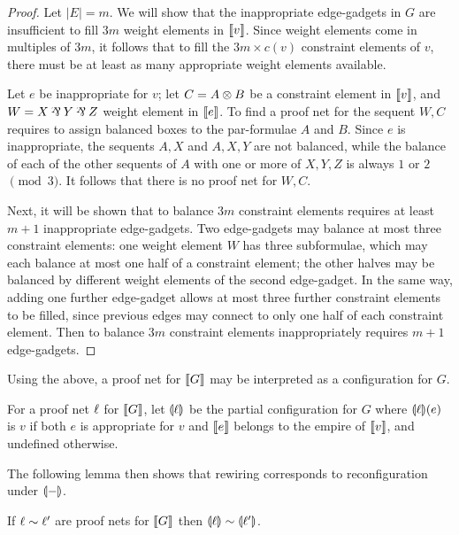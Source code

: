 \documentclass{lmcs}
\begin{document}
\begin{proof}
%
Let $|E|=m$.
%
We will show that the inappropriate edge-gadgets in $G$ are insufficient to fill $3m$ weight elements in $\llbracket v\rrbracket$.
%
Since weight elements come in multiples of $3m$, it follows that to fill the $3m\times c(v)$ constraint elements of $v$, there must be at least as many appropriate weight elements available.



Let $e$ be inappropriate for $v$; let $C=A\otimes B$ be a constraint element in $\llbracket v\rrbracket$, and $W=X\parr Y\parr Z$ weight element  in $\llbracket e\rrbracket$.
%
To find a proof net for the sequent $W,C$ requires to assign balanced boxes to the par-formulae $A$ and $B$.
%
Since $e$ is inappropriate, the sequents $A,X$ and $A,X,Y$ are not balanced, while the balance of each of the other sequents of $A$ with one or more of $X,Y,Z$ is always $1$ or $2$ $\pmod 3$.
%
It follows that there is no proof net for $W,C$.


Next, it will be shown that to balance $3m$ constraint elements requires at least $m+1$ inappropriate edge-gadgets.
%
Two edge-gadgets may balance at most three constraint elements: one weight element $W$ has three subformulae, which may each balance at most one half of a constraint element; the other halves may be balanced by different weight elements of the second edge-gadget.
%
In the same way, adding one further edge-gadget allows at most three further constraint elements to be filled, since previous edges may connect to only one half of each constraint element.
%
Then to balance $3m$ constraint elements inappropriately requires $m+1$ edge-gadgets.
%
\end{proof}



Using the above, a proof net for $\llbracket G\rrbracket$ may be interpreted as a configuration for $G$.



\begin{definition}
For a proof net $\ell$ for $\llbracket G\rrbracket$, let $\llparenthesis\ell\rrparenthesis$ be the partial configuration for $G$ where $\llparenthesis\ell\rrparenthesis(e)$ is $v$ if both $e$ is appropriate for $v$ and $\llbracket e\rrbracket$ belongs to the empire of $\llbracket v\rrbracket$, and  undefined otherwise.
\end{definition}


The following lemma then shows that rewiring corresponds to reconfiguration under $\llparenthesis-\rrparenthesis$.



\begin{lemma}
\label{lem:soundness}
If $\links\perm\links'$ are proof nets for $\llbracket G\rrbracket$ then $\coitn\links\perm\coitn{\links'}$.
\end{lemma}
\end{document}
